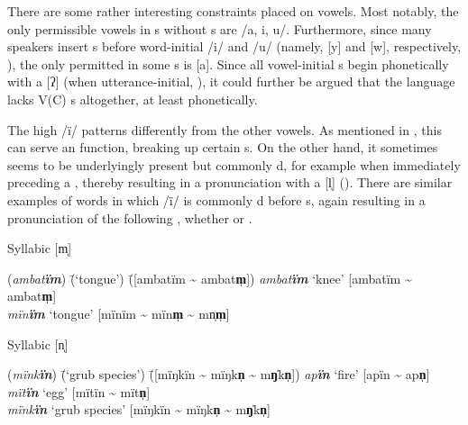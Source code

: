   There are some rather interesting  constraints placed on vowels. Most notably, the only permissible vowels in s without  s are /a, i, u/. Furthermore, since many speakers insert  s before word-initial /i/ and /u/ (namely, [y] and [w], respectively, ), the only permitted   in some s is [a]. Since all vowel-initial s begin phonetically with a    [ʔ] (when utterance-initial, ), it could further be argued that the language lacks V(C) s altogether, at least phonetically.

  The high  /ï/ patterns differently from the other vowels. As mentioned in , this  can serve an  function, breaking up certain s. On the other hand, it sometimes seems to be underlyingly present but commonly d, for example when immediately preceding a , thereby resulting in a pronunciation with a   [l̩] (). There are similar examples of words in which /ï/ is commonly d before s, again resulting in a  pronunciation of the following  , whether   or  .

\ea%
    \label{ex:phon:54}
          Syllabic [m̩]\\
\begin{tabbing}
{(\textit{ambat\textbf{ïm}})} \= {(‘tongue’)} \= {([ambatïm {\textasciitilde} ambat\textbf{m̩}])}\kill
{\textit{ambat\textbf{ïm}}} \> {‘knee’} \> {[ambatïm {\textasciitilde} ambat\textbf{m̩}]}\\
{\textit{mïn\textbf{ïm}}} \> {‘tongue’} \> {[mïnïm {\textasciitilde} mïn\textbf{m̩} {\textasciitilde} mn̩\textbf{m̩}]}\textbf{}
\end{tabbing}
\z

\ea%
    \label{ex:phon:54a}
  Syllabic [n̩]\\
\begin{tabbing}
{(\textit{mïnk\textbf{ïn}})} \= {(‘grub species’)} \= {([mïŋkïn {\textasciitilde} mïŋk\textbf{n̩} {\textasciitilde} m\textbf{ŋ̍}k\textbf{n̩}])}\kill
{\textit{ap\textbf{ïn}}} \> {‘fire’} \> {[apïn {\textasciitilde} ap\textbf{n̩}]}\\
{\textit{mït\textbf{ïn}}} \> {‘egg’} \> {[mïtïn {\textasciitilde} mït\textbf{n̩}]}\\
{\textit{mïnk\textbf{ïn}}} \> {‘grub species’} \> {[mïŋkïn {\textasciitilde} mïŋk\textbf{n̩} {\textasciitilde} m\textbf{ŋ̍}k\textbf{n̩}]}
\end{tabbing}
\z

